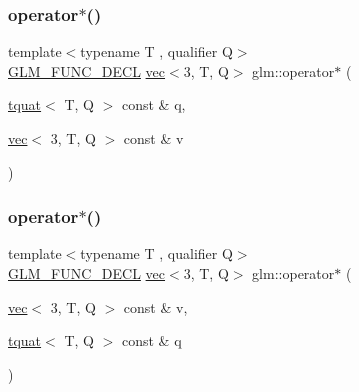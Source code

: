 \subsubsection{\texorpdfstring{operator$\ast$()}{operator*()}\hspace{0.1cm}{\footnotesize\ttfamily [2/7]}}
{\footnotesize\ttfamily template$<$typename T , qualifier Q$>$ \\
\hyperlink{setup_8hpp_ab2d052de21a70539923e9bcbf6e83a51}{G\+L\+M\+\_\+\+F\+U\+N\+C\+\_\+\+D\+E\+CL} \hyperlink{structglm_1_1vec}{vec}$<$3, T, Q$>$ glm\+::operator$\ast$ (\begin{DoxyParamCaption}\item[{\hyperlink{structglm_1_1tquat}{tquat}$<$ T, Q $>$ const \&}]{q,  }\item[{\hyperlink{structglm_1_1vec}{vec}$<$ 3, T, Q $>$ const \&}]{v }\end{DoxyParamCaption})}

\mbox{\label{group__gtc__quaternion_ga97f1c7e2d4ae80aad5d8813aed7d860e}} 
\subsubsection{\texorpdfstring{operator$\ast$()}{operator*()}\hspace{0.1cm}{\footnotesize\ttfamily [3/7]}}
{\footnotesize\ttfamily template$<$typename T , qualifier Q$>$ \\
\hyperlink{setup_8hpp_ab2d052de21a70539923e9bcbf6e83a51}{G\+L\+M\+\_\+\+F\+U\+N\+C\+\_\+\+D\+E\+CL} \hyperlink{structglm_1_1vec}{vec}$<$3, T, Q$>$ glm\+::operator$\ast$ (\begin{DoxyParamCaption}\item[{\hyperlink{structglm_1_1vec}{vec}$<$ 3, T, Q $>$ const \&}]{v,  }\item[{\hyperlink{structglm_1_1tquat}{tquat}$<$ T, Q $>$ const \&}]{q }\end{DoxyParamCaption})}

\mbox{\label{group__gtc__quaternion_ga69d38a6ce6b49b97147c26274ada8911}} 
